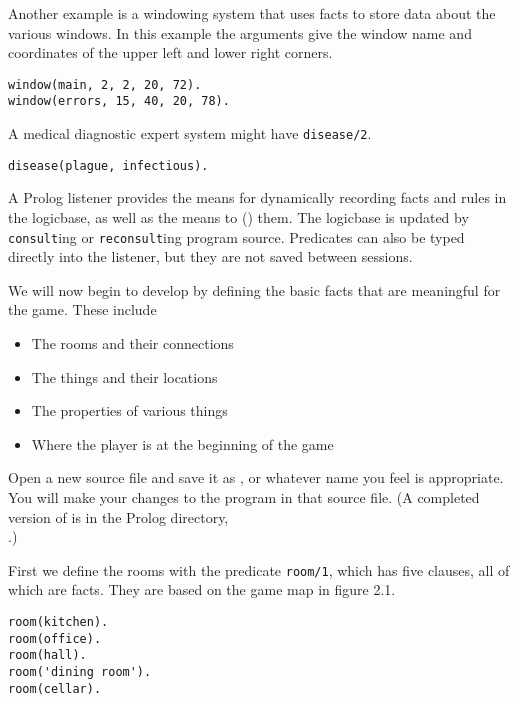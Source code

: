 Another example is a windowing system that uses facts to store data about the
various windows. In this example the arguments give the window name and
coordinates of the upper left and lower right corners.
\begin{verbatim}
window(main, 2, 2, 20, 72).
window(errors, 15, 40, 20, 78).
\end{verbatim}

A medical diagnostic expert system might have \verb'disease/2'.
\begin{verbatim}
disease(plague, infectious).
\end{verbatim}

A Prolog listener provides the means for dynamically recording facts and rules
in the logicbase, as well as the means to 
() them. The logicbase is updated by
\verb'consult'ing or \verb'reconsult'ing program source. Predicates can also be
typed directly into the listener, but they are not saved between sessions.


We will now begin to develop  by defining the basic facts that
are meaningful for the game. These include
\begin{itemize}[nosep]
  \item 
The rooms and their connections
  \item 
The things and their locations
  \item 
The properties of various things
  \item 
Where the player is at the beginning of the game
\end{itemize}

Open a new source file and save it as , or whatever name you feel is appropriate. You
will make your changes to the program in that source file. (A completed version
of  is in the Prolog 
directory,\\.)

First we define the rooms with the predicate \verb|room/1|, which has five
clauses, all of which are facts. They are based on the game map in figure 2.1.
\begin{verbatim}
room(kitchen).
room(office).
room(hall).
room('dining room').
room(cellar).
\end{verbatim}



\secup